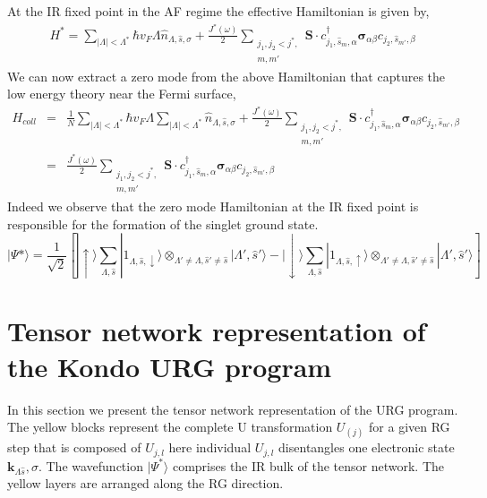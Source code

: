 \documentclass[aps,prl,preprint,groupedaddress]{revtex4-2}
\begin{document}
\par\noindent
At the IR fixed point in the AF regime the effective Hamiltonian is given by,
\begin{eqnarray}
H^{*}=\sum_{|\Lambda|<\Lambda^{*}}\hbar v_{F}\Lambda\hat{n}_{\Lambda,\hat{s},\sigma}+\frac{J^{*}(\omega)}{2}\sum_{\substack{j_{1},j_{2}<j^{*},\\ m,m'}}\mathbf{S}\cdot c^{\dagger}_{j_{1},\hat{s}_{m},\alpha}\boldsymbol{\sigma}_{\alpha\beta}c_{j_{2},\hat{s}_{m'},\beta}
\end{eqnarray} 
We can now extract a zero mode from the above Hamiltonian that captures the low energy theory near the Fermi surface,
\begin{eqnarray}
H_{coll}&=&\frac{1}{N}\sum_{|\Lambda|<\Lambda^{*}}\hbar v_{F}\Lambda\sum_{|\Lambda|<\Lambda^{*}}\hat{n}_{\Lambda,\hat{s},\sigma}+\frac{J^{*}(\omega)}{2}\sum_{\substack{j_{1},j_{2}<j^{*},\\ m,m'}}\mathbf{S}\cdot c^{\dagger}_{j_{1},\hat{s}_{m},\alpha}\boldsymbol{\sigma}_{\alpha\beta}c_{j_{2},\hat{s}_{m'},\beta}\nonumber\\
		&=&\frac{J^{*}(\omega)}{2}\sum_{\substack{j_{1},j_{2}<j^{*},\\ m,m'}}\mathbf{S}\cdot c^{\dagger}_{j_{1},\hat{s}_{m},\alpha}\boldsymbol{\sigma}_{\alpha\beta}c_{j_{2},\hat{s}_{m'},\beta}
\end{eqnarray}
Indeed we observe that the zero mode Hamiltonian at the IR fixed point is responsible for the formation of the singlet ground state.
\begin{equation}
|\Psi*\rangle=\frac{1}{\sqrt{2}}\left[|\uparrow\rangle\sum_{\Lambda,\hat{s}}|1_{\Lambda,\hat{s},\downarrow}\rangle\otimes_{\Lambda'\neq\Lambda,\hat{s}'\neq \hat{s}}|\Lambda',\hat{s}'\rangle-|\downarrow\rangle\sum_{\Lambda,\hat{s}}|1_{\Lambda,\hat{s},\uparrow}\rangle\otimes_{\Lambda'\neq\Lambda,\hat{s}'\neq \hat{s}}|\Lambda',\hat{s}'\rangle\right]
\end{equation}
\section{Tensor network representation of the Kondo URG program}
In this section we present the tensor network representation of the URG program\cite{anirbanurg1,mukherjee2020}. The yellow blocks represent the complete U transformation $U_{(j)}$ for a given RG step that is composed of $U_{j,l}$ here individual $U_{j,l}$ disentangles one electronic state $\mathbf{k}_{\Lambda\hat{s}},\sigma$. The wavefunction $|\Psi^{*}\rangle$ comprises the IR bulk of the tensor network. The yellow layers are arranged along the RG direction. 
\end{document}
